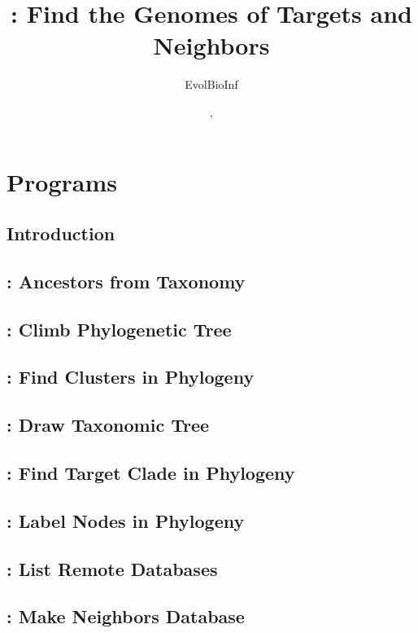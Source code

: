\documentclass[a4paper]{book}
\begin{document}
\title{: Find the Genomes of Targets and Neighbors}
\author{EvolBioInf}
\date{\!\!, \\\vspace{2cm}\resizebox{\textwidth}{!}{}}
\maketitle
\tableofcontents
\part{Programs}
\chapter{Introduction}

\chapter{: Ancestors from Taxonomy}

\chapter{: Climb Phylogenetic Tree}

\chapter{: Find Clusters in Phylogeny}

\chapter{: Draw Taxonomic Tree}

\chapter{: Find Target Clade in Phylogeny}

\chapter{: Label Nodes in Phylogeny}

\chapter{: List Remote Databases}

\chapter{: Make Neighbors Database}

\end{document}
